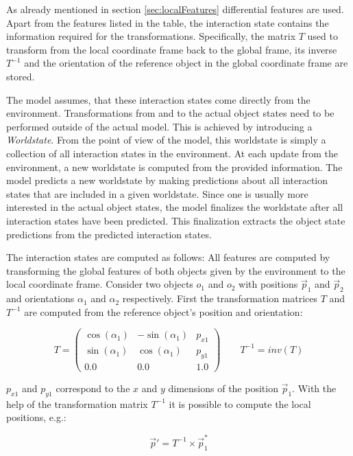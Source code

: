 As already mentioned in section \ref{sec:localFeatures} differential features are used. Apart from the features listed in the table, the interaction state contains the information required for the transformations. Specifically, the matrix $T$ used to transform from the local coordinate frame back to the global frame, its inverse $T^{-1}$ and the orientation of the reference object in the global coordinate frame are stored.

The model assumes, that these interaction states come directly from the environment. Transformations from and to the actual object states need to be performed outside of the actual model. This is achieved by introducing a \textit{Worldstate}. From the point of view of the model, this worldstate is simply a collection of all interaction states in the environment. At each update from the environment, a new worldstate is computed from the provided information. The model predicts a new worldstate by making predictions about all interaction states that are included in a given worldstate. Since one is usually more interested in the actual object states, the model finalizes the worldstate after all interaction states have been predicted. This finalization extracts the object state predictions from the predicted interaction states. 

The interaction states are computed as follows:
All features are computed by transforming the global features of both objects given by the environment to the local coordinate frame. Consider two objects $o_1$ and $o_2$ with positions $\vec{p}_1$ and $\vec{p}_2$ and orientations $\alpha_1$ and $\alpha_2$ respectively. First the transformation matrices $T$ and $T^{-1}$ are computed from the reference object's position and orientation:

\begin{equation}
T = \begin{pmatrix}
\cos(\alpha_1) & -\sin(\alpha_1) & p_{x1} \\
\sin(\alpha_1) & \cos(\alpha_1) & p_{y1} \\
0.0 & 0.0 & 1.0
\end{pmatrix}
\qquad
T^{-1} = inv(T)
\label{eq:transMatrix}
\end{equation}

$p_{x1}$ and $p_{y1}$ correspond to the $x$ and $y$ dimensions of the position $\vec{p}_1$. With the help of the transformation matrix $T^{-1}$ it is possible to compute the local positions, e.g.:

\begin{equation}
\vec{p}' = T^{-1} \times \vec{p}_1^*
\end{equation}

